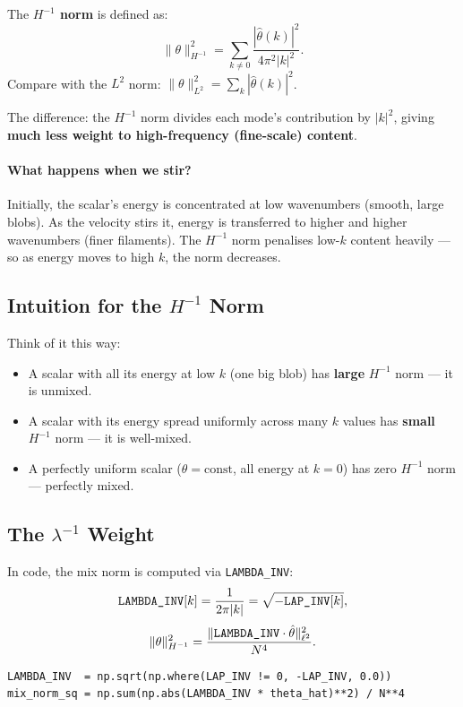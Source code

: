 \documentclass[12pt,a4paper]{article}
\newcommand{\hminusone}{H^{-1}}
\newcommand{\code}[1]{\texttt{#1}}
\newcommand{\LAPINV}{\text{\texttt{LAP\_INV}}}
\newcommand{\LAMBDAINV}{\text{\texttt{LAMBDA\_INV}}}
\theoremstyle{definition}
\begin{document}
The \textbf{$\hminusone$ norm} is defined as:
\begin{equation}
  \|\theta\|_{H^{-1}}^2
  = \sum_{k\neq 0}\frac{|\hat\theta(k)|^2}{4\pi^2|k|^2}.
\end{equation}
Compare with the $L^2$ norm: $\|\theta\|_{L^2}^2 = \sum_k|\hat\theta(k)|^2$.

The difference: the $\hminusone$ norm divides each mode's contribution by
$|k|^2$, giving \textbf{much less weight to high-frequency (fine-scale)
content}.

\paragraph{What happens when we stir?}
Initially, the scalar's energy is concentrated at low wavenumbers (smooth,
large blobs).  As the velocity stirs it, energy is transferred to higher and
higher wavenumbers (finer filaments).  The $\hminusone$ norm penalises low-$k$
content heavily — so as energy moves to high $k$, the norm decreases.

\subsection{Intuition for the $H^{-1}$ Norm}

Think of it this way:
\begin{itemize}
  \item A scalar with all its energy at low $k$ (one big blob) has
    \textbf{large} $\hminusone$ norm — it is unmixed.
  \item A scalar with its energy spread uniformly across many $k$ values has
    \textbf{small} $\hminusone$ norm — it is well-mixed.
  \item A perfectly uniform scalar ($\theta = \mathrm{const}$, all energy at
    $k=0$) has zero $\hminusone$ norm — perfectly mixed.
\end{itemize}

\subsection{The $\lambda^{-1}$ Weight}

In code, the mix norm is computed via \code{LAMBDA\_INV}:
\begin{equation}
  \LAMBDAINV[k] = \frac{1}{2\pi|k|} = \sqrt{-\LAPINV[k]},
\end{equation}
\begin{equation}
  \|\theta\|_{H^{-1}}^2
  = \frac{\|\LAMBDAINV\cdot\hat\theta\|_{\ell^2}^2}{N^4}.
\end{equation}
\begin{lstlisting}
LAMBDA_INV  = np.sqrt(np.where(LAP_INV != 0, -LAP_INV, 0.0))
mix_norm_sq = np.sum(np.abs(LAMBDA_INV * theta_hat)**2) / N**4
\end{lstlisting}
\end{document}
